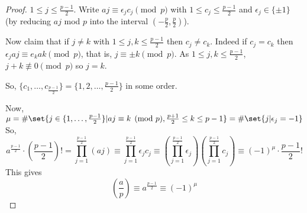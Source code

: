 \documentclass{article}
\newcommand{\legendre}[2]{\genfrac{(}{)}{}{}{#1}{#2}}
\begin{document}

\begin{proof}
    $1 \leq j \leq \frac{p-1}{2}$. Write $aj \equiv \epsilon_j c_j \pmod{p}$ with $1 \leq c_j \leq \frac{p-1}{2}$ and $\epsilon_j \in \{\pm 1\}$ (by reducing $aj$ mod $p$ into the interval $(-\frac{p}{2}, \frac{p}{2})$).

    Now claim that if $j \neq k$ with $1 \leq j, k \leq \frac{p-1}{2}$ then $c_j \neq c_k$. Indeed if $c_j = c_k$ then $\epsilon_j aj \equiv e_k ak \pmod{p}$, that is, $j \equiv \pm k \pmod{p}$.
    As $1 \leq j, k \leq \frac{p-1}{2}$, $j + k \not\equiv 0 \pmod{p}$ so $j = k$.

    So, $\{c_1, \dotsc, c_{\frac{p-1}{2}}\} = \{1, 2, \dotsc, \frac{p-1}{2}\}$ in some order.

    Now, $\mu = \#\set{j \in \{1, \dotsc, \frac{p-1}{2}\} | aj \equiv k \pmod{p}, \frac{p+1}{2} \leq k \leq p-1} = \#\set{j | \epsilon_j = -1}$
    So,
    \begin{equation*}
        a^{\frac{p-1}{2}} \cdot \left(\frac{p-1}{2}\right)!
        = \prod_{j=1}^{\frac{p-1}{2}} (aj)
        \equiv \prod_{j=1}^{\frac{p-1}{2}} \epsilon_j c_j
        \equiv \left(\prod_{j=1}^{\frac{p-1}{2}} \epsilon_j \right) \left(\prod_{j=1}^{\frac{p-1}{2}} c_j \right)
        \equiv (-1)^\mu \cdot \frac{p-1}{2}!
    \end{equation*}
    This gives
    \begin{equation*}
        \legendre{a}{p} \equiv a^{\frac{p-1}{2}} \equiv (-1)^\mu
    \end{equation*}
\end{proof}

\end{document}
